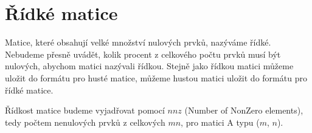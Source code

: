 \section{Řídké matice}

Matice, které obsahují velké množství nulových prvků, nazýváme řídké. Nebudeme přesně uvádět, kolik procent z celkového počtu prvků musí být nulových, abychom matici nazývali řídkou. Stejně jako řídkou matici můžeme uložit do formátu pro husté matice, můžeme hustou matici uložit do formátu pro řídké matice.

Řídkost matice budeme vyjadřovat pomocí $nnz$ (Number of NonZero elements), tedy počtem nenulových prvků z celkových $mn$, pro matici A typu ($m$, $n$).













